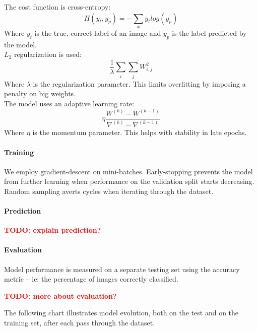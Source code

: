 \documentclass[a4paper]{article}
\newcommand{\TODO}[1]{\noindent \textbf{\textcolor{red}{TODO: #1}}}
\begin{document}
The cost function is cross-entropy:
$$H(y_t, y_p)=-\sum_x y_t log(y_p)$$
Where $y_t$ is the true, correct label of an image and $y_p$ is the label predicted by the model.
\\

$L_2$ regularization is used:
$$\frac{1}{\lambda} \sum_i \sum_j W_{i,j}^2$$
Where $\lambda$ is the regularization parameter. This limits overfitting by imposing a penalty on big weights.
\\

The model uses an adaptive learning rate:
$$\eta \frac{ W^{(k)} - W^{(k-1)} } { \nabla^{(k)} - \nabla^{(k-1)} }$$
Where $\eta$ is the momentum parameter. This helps with stability in late epochs.

\paragraph{Training} We employ gradient-descent on mini-batches. Early-stopping prevents the model from further learning when performance on the validation split starts decreasing. Random sampling averts cycles when iterating through the dataset.

\paragraph{Prediction}
\TODO{explain prediction?}

\paragraph{Evaluation}
Model performance is measured on a separate testing set using the accuracy metric -- ie: the percentage of images correctly classified.

\TODO{more about evaluation?}

\noindent The following chart illustrates model evolution, both on the test and on the training set, after each pass through the dataset.

\begin{center}
\end{center}
\end{document}
